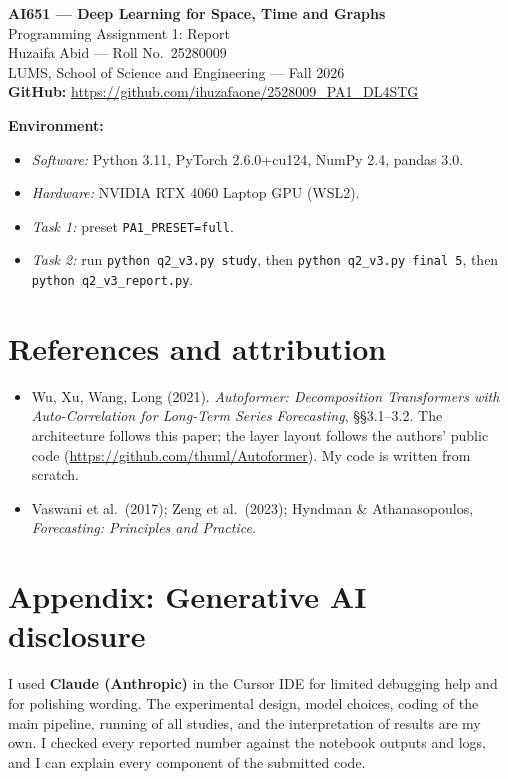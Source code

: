 \documentclass[10pt,a4paper]{article}
\begin{document}
\begin{center}
{\Large\bfseries AI651 --- Deep Learning for Space, Time and Graphs}\\[2pt]
{\large Programming Assignment 1: Report}\\[6pt]
Huzaifa Abid --- Roll No.\ 25280009\\
LUMS, School of Science and Engineering --- Fall 2026\\[4pt]
\textbf{GitHub:} \url{https://github.com/ihuzafaone/2528009_PA1_DL4STG}
\end{center}

\textbf{Environment:}
\begin{itemize}
\item \emph{Software:} Python 3.11, PyTorch 2.6.0+cu124, NumPy 2.4, pandas 3.0.
\item \emph{Hardware:} NVIDIA RTX 4060 Laptop GPU (WSL2).
\item \emph{Task 1:} preset \texttt{PA1\_PRESET=full}.
\item \emph{Task 2:} run \texttt{python q2\_v3.py study}, then \texttt{python q2\_v3.py final 5}, then \texttt{python q2\_v3\_report.py}.
\end{itemize}


\clearpage


\section*{References and attribution}
\begin{itemize}
\item Wu, Xu, Wang, Long (2021). \emph{Autoformer: Decomposition Transformers with Auto-Correlation for Long-Term Series Forecasting}, \S\S3.1--3.2. The architecture follows this paper; the layer layout follows the authors' public code (\url{https://github.com/thuml/Autoformer}). My code is written from scratch.
\item Vaswani et al.\ (2017); Zeng et al.\ (2023); Hyndman \& Athanasopoulos, \emph{Forecasting: Principles and Practice}.
\end{itemize}

\section*{Appendix: Generative AI disclosure}
I used \textbf{Claude (Anthropic)} in the Cursor IDE for limited debugging help and for polishing wording. The experimental design, model choices, coding of the main pipeline, running of all studies, and the interpretation of results are my own. I checked every reported number against the notebook outputs and logs, and I can explain every component of the submitted code.
\end{document}
